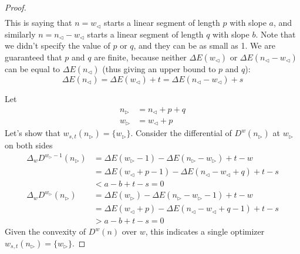 \documentclass[]{article}
\begin{document}
\begin{proof}
\begin{align*}
	\end{align*} 
	This is saying that $n = w_{\triangleleft}$ starts a linear segment of length $p$ with slope $a$, and similarly $n = n_{\triangleleft} - w_{\triangleleft}$ starts a linear segment of length $q$ with slope $b$. Note that we didn't specify the value of $p$ or $q$, and they can be as small as 1. We are guaranteed that $p$ and $q$ are finite, because neither  $\Delta E(w_{\triangleleft})$ or $\Delta E(n_{\triangleleft} - w_{\triangleleft})$ can be equal to $\Delta E(n_{\triangleleft})$ (thus giving an upper bound to $p$ and $q$):
	\[
	\Delta E(n_{\triangleleft}) = \Delta E(w_{\triangleleft}) + t = \Delta E(n_{\triangleleft} - w_{\triangleleft}) + s
	\]
	
	Let 
	\begin{align*}
	n_{\triangleright} &= n_{\triangleleft} + p + q\\
	w_{\triangleright} &= w_{\triangleleft} + p
	\end{align*}
	Let's show that $w_{s,t}(n_{\triangleright}) = \{w_{\triangleright}\}$. Consider the differential of $D^w(n_{\triangleright})$ at $w_{\triangleright}$ on both sides
	\begin{align*}
	\Delta_w D^{w_{\triangleright} - 1}(n_{\triangleright}) &= \Delta E(w_{\triangleright} - 1) - \Delta E(n_{\triangleright} - w_{\triangleright}) +t - w \\
	&=\Delta E(w_{\triangleleft} + p - 1) - \Delta E(n_{\triangleleft} - w_{\triangleleft} + q) +t - s\\
	&<a - b + t - s = 0\\
	\Delta_w D^{w_{\triangleright}}(n_{\triangleright}) &= \Delta E(w_{\triangleright}) - \Delta E(n_{\triangleright} - w_{\triangleright} - 1) +t - w \\
	&=\Delta E(w_{\triangleleft} + p) - \Delta E(n_{\triangleleft} - w_{\triangleleft} + q - 1) +t - s\\
	& > a - b + t - s =0
	\end{align*}
	Given the convexity of $D^w(n)$ over $w$, this indicates a single optimizer $w_{s,t}(n_{\triangleright}) = \{w_{\triangleright}\}$.
	

\end{proof}
\end{document}
